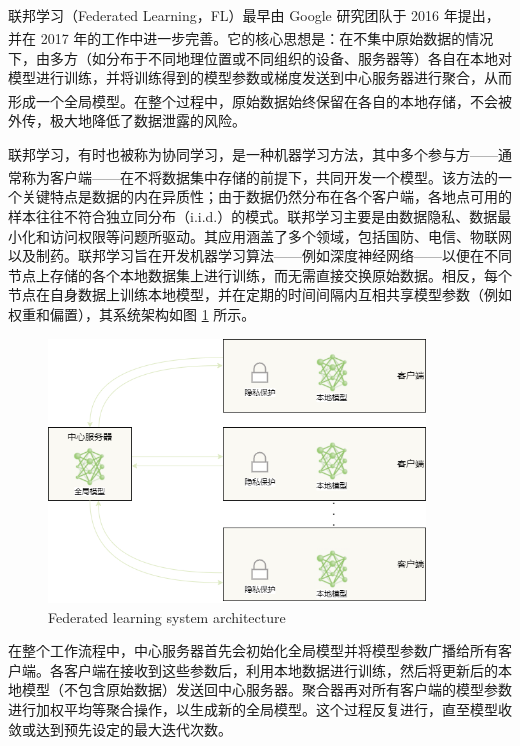 联邦学习（Federated Learning，FL）最早由 Google 研究团队于 2016 年提出\textsuperscript{\cite{konevcny2016federated}}，并在 2017 年的工作中进一步完善\textsuperscript{\cite{mcmahan2017communication}}。它的核心思想是：在不集中原始数据的情况下，由多方（如分布于不同地理位置或不同组织的设备、服务器等）各自在本地对模型进行训练，并将训练得到的模型参数或梯度发送到中心服务器进行聚合，从而形成一个全局模型\textsuperscript{\cite{li2020federated}}。在整个过程中，原始数据始终保留在各自的本地存储，不会被外传，极大地降低了数据泄露的风险。

联邦学习，有时也被称为协同学习，是一种机器学习方法，其中多个参与方——通常称为客户端——在不将数据集中存储的前提下，共同开发一个模型\textsuperscript{\cite{kairouz2021advances}}。该方法的一个关键特点是数据的内在异质性；由于数据仍然分布在各个客户端，各地点可用的样本往往不符合独立同分布（i.i.d.）的模式。联邦学习主要是由数据隐私、数据最小化和访问权限等问题所驱动。其应用涵盖了多个领域，包括国防、电信、物联网以及制药。联邦学习旨在开发机器学习算法——例如深度神经网络——以便在不同节点上存储的各个本地数据集上进行训练，而无需直接交换原始数据。相反，每个节点在自身数据上训练本地模型，并在定期的时间间隔内互相共享模型参数（例如权重和偏置），其系统架构如图 \ref{FedArch} 所示。

\vspace{-0.1cm}
\begin{figure}[h]
	\centering
	\includegraphics[width=10cm]{chapters/imgs/FedArch3} %
	{\wuhao Federated learning system architecture}
	\label{FedArch}
\end{figure}
\vspace{-0.35cm}

在整个工作流程中，中心服务器首先会初始化全局模型并将模型参数广播给所有客户端。各客户端在接收到这些参数后，利用本地数据进行训练，然后将更新后的本地模型（不包含原始数据）发送回中心服务器。聚合器再对所有客户端的模型参数进行加权平均等聚合操作，以生成新的全局模型。这个过程反复进行，直至模型收敛或达到预先设定的最大迭代次数。

